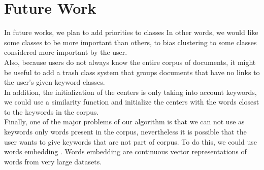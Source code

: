 \section{Future Work}
In future works, we plan to add priorities to classes In other words, we would like some classes
to be more important than others, to bias clustering to some classes considered more
important by the user.
\\Also, because users do not always know the entire corpus of
documents, it might be useful to add a trash class system that groups documents
that have no links to the user's given keyword classes.
\\In addition, the
initialization of the centers is only taking into account keywords, we could use
a similarity function and initialize the centers with the words closest to the
keywords in the corpus.
\\Finally, one of the major problems of our algorithm is
that we can not use as keywords only words present in the corpus, nevertheless
it is possible that the user wants to give keywords that are not part of corpus.
To do this, we could use words embedding \cite{2013arXiv1301.3781M}.
Words embedding are continuous vector representations of words from very large 
datasets. 
